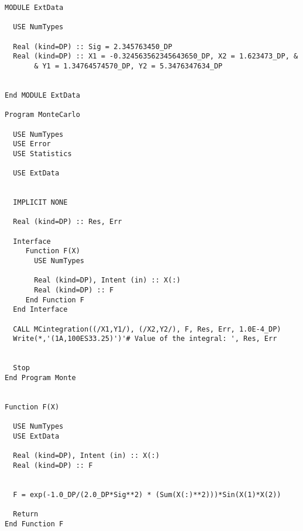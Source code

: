 \begin{lstlisting}[emph=MCIntegration,
                   emphstyle=\color{blue},
                   frame=trBL,
                   caption=Integrating a two dimensional function.,
                   label=BstrpConfInt]
MODULE ExtData

  USE NumTypes
  
  Real (kind=DP) :: Sig = 2.345763450_DP
  Real (kind=DP) :: X1 = -0.324563562345643650_DP, X2 = 1.623473_DP, &
       & Y1 = 1.34764574570_DP, Y2 = 5.3476347634_DP


End MODULE ExtData

Program MonteCarlo
  
  USE NumTypes
  USE Error
  USE Statistics

  USE ExtData


  IMPLICIT NONE

  Real (kind=DP) :: Res, Err

  Interface
     Function F(X)
       USE NumTypes
              
       Real (kind=DP), Intent (in) :: X(:)
       Real (kind=DP) :: F
     End Function F
  End Interface

  CALL MCintegration((/X1,Y1/), (/X2,Y2/), F, Res, Err, 1.0E-4_DP)
  Write(*,'(1A,100ES33.25)')'# Value of the integral: ', Res, Err
 

  Stop
End Program Monte


Function F(X)

  USE NumTypes
  USE ExtData

  Real (kind=DP), Intent (in) :: X(:)
  Real (kind=DP) :: F


  F = exp(-1.0_DP/(2.0_DP*Sig**2) * (Sum(X(:)**2)))*Sin(X(1)*X(2))

  Return
End Function F
\end{lstlisting}




